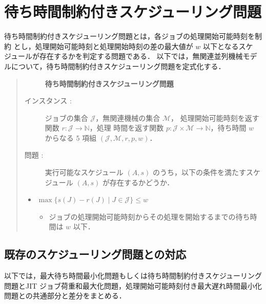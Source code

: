 \documentclass[12pt]{optlab-bachelor}
\begin{document}
\section{待ち時間制約付きスケジューリング問題}
待ち時間制約付きスケジューリング問題とは，各ジョブの処理開始可能時刻を制約
とし，処理開始可能時刻と処理開始時刻の差の最大値が $w$ 以下となるスケ
ジュールが存在するかを判定する問題である．
以下では，無関連並列機械モデルについて，待ち時間制約付きスケジューリング問題を定式化する．

\begin{quote}
  \begin{description}
    \item[] {\bf 待ち時間制約付きスケジューリング問題}
    \item[インスタンス : ]
    ジョブの集合 $\mathcal{J}$，無関連機械の集合 $\mathcal{M}$，
    処理開始可能時刻を返す関数 $r : \mathcal{J} \to \mathbb{N}$，処理
    時間を返す関数 $p : \mathcal{J} \times \mathcal{M} \to \mathbb{N}$，待ち時間 $w$ からなる 5 項組 $(\mathcal{J}, \mathcal{M}, r, p, w)$．

    \item[問題 : ] 実行可能なスケジュール $(A,s)$ のうち，以下の条件を満たすスケジュール $(A,s)$ が存在するかどうか．
  \end{description}

  \begin{itemize}
    \item $\max\big\{s(J) - r(J) \mid J \in \mathcal{J}\big\} \le w$
    \begin{itemize}
      \item ジョブの処理開始可能時刻からその処理を開始するまでの待ち時間は $w$ 以下．
    \end{itemize}
  \end{itemize}
\end{quote}

\subsection{既存のスケジューリング問題との対応}
以下では，最大待ち時間最小化問題もしくは待ち時間制約付きスケジューリング問題とJIT ジョブ荷重和最大化問題，処理開始可能時刻付き最大遅れ時間最小化問題との共通部分と差分をまとめる．
\end{document}
